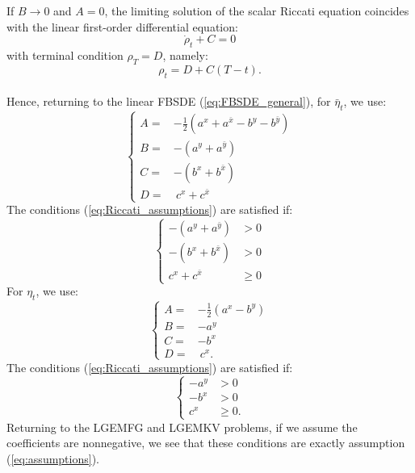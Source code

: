 \documentclass[11pt]{article}
\begin{document}
\begin{appendices}
	If $B \to 0$ and $A = 0$, the limiting solution of the scalar Riccati equation coincides with the linear first-order differential equation:
	\begin{equation*}
	    \dot{\rho}_t +C = 0
	\end{equation*}
	with terminal condition $\rho_T = D$, namely:
	\begin{equation*}
	    \rho_t = D + C(T-t).
	\end{equation*}\\
Hence, returning to the linear FBSDE (\ref{eq:FBSDE_general}), for $\bar{\eta}_t$, we use:
\begin{equation*}
	\left\{
	\begin{array}{rl}
		A=&-\frac{1}{2}(a^x+a^{\bar{x}}-b^y-b^{\bar{y}}) \\
		B=&-(a^y+a^{\bar{y}}) \\
		C=&-(b^x+b^{\bar{x}}) \\
		D=&\ c^x+c^{\bar{x}}
	\end{array}
	\right.
\end{equation*}
The conditions (\ref{eq:Riccati_assumptions}) are satisfied if:
\begin{equation*}
	\left\{
	\begin{array}{rl}
		-(a^y+a^{\bar{y}})&>0 \\
		-(b^x+b^{\bar{x}})&>0 \\
		c^x+c^{\bar{x}}& \geq 0
	\end{array}
	\right.
\end{equation*}
For $\eta_t$, we use:
\begin{equation*}
	\left\{
	\begin{array}{rl}
		A=&-\frac{1}{2}(a^x-b^y) \\
		B=&-a^y \\
		C=&-b^x \\
		D=&\ c^x.
	\end{array}
	\right.
\end{equation*}
The conditions (\ref{eq:Riccati_assumptions}) are satisfied if:
\begin{equation*}
	\left\{
	\begin{array}{rl}
		-a^y&>0 \\
		-b^x&>0 \\
		c^x& \geq0.
	\end{array}
	\right.
\end{equation*}
Returning to the LGEMFG and LGEMKV problems, if we assume the coefficients are nonnegative, we see that these conditions are exactly assumption (\ref{eq:assumptions}).

\end{appendices}
\end{document}
